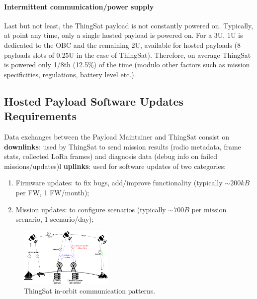 \paragraph*{Intermittent communication/power supply}
Last but not least, the ThingSat payload is not constantly powered on. Typically, at point any time,
only a single hosted payload is powered on. For a 3U, 1U is dedicated to the OBC
and the remaining 2U, available for hosted payloads (8 payloads slots of 0.25U
in the case of ThingSat). Therefore, on average ThingSat is powered only 1/8th (12.5\%) of the time
(modulo other factors such as mission specificities, regulations, battery level etc.).

\subsection{Hosted Payload Software Updates Requirements}
\label{sec:thingsat-update-req}
Data exchanges between the Payload Maintainer and ThingSat consist on
\textbf{downlinks}: used by ThingSat to send mission results (radio metadata, frame stats, collected LoRa frames)
and diagnosis data (debug info on failed missions/updates)l \textbf{uplinks}: used for software updates of two categories:
\begin{enumerate}
    \item Firmware updates: to fix bugs, add/improve functionality (typically $\sim 200kB$ per FW, 1 FW/month);
    \item Mission updates: to configure scenarios (typically $\sim 700B$ per mission scenario, 1 scenario/day);
\end{enumerate}

\begin{figure}[t]
    \centering
    \includegraphics[width=0.4\textwidth]{Figures/thingsat-dtn.png}
    \caption{ThingSat in-orbit communication patterns.}
    \label{fig:thingsat-comm}
\end{figure}
